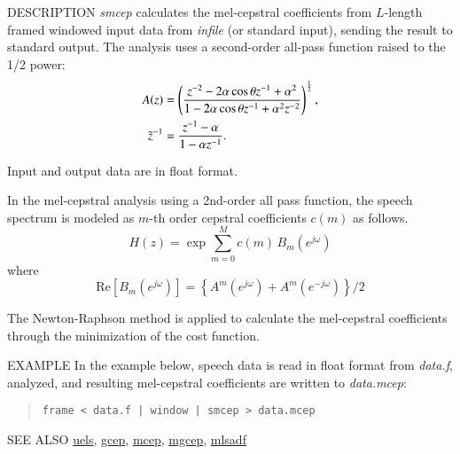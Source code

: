 \begin{qsection}{DESCRIPTION}
{\em smcep} calculates the mel-cepstral coefficients 
from $L$-length framed windowed input data 
from {\em infile} (or standard input), 
sending the result to standard output. 
The analysis uses a second-order all-pass function raised to the 1/2 power: 
\begin{align}
A(z) &=
\left(
\frac{z^{-2}-2\alpha \cos \theta z^{-1}+\alpha^2}
	{1-2\alpha \cos \theta z^{-1}+\alpha^2 z^{-2}}
\right)^{\frac{1}{2}}, \notag \\
\tilde{z}^{-1} &= \frac{z^{-1}-\alpha}{1-\alpha z^{-1}}. \notag
\end{align}

Input and output data are in float format.

In the mel-cepstral analysis using
a 2nd-order all pass function,
the speech spectrum is modeled as $m$-th order cepstral
coefficients $c(m)$ as follows.
\begin{displaymath}
H(z) = \exp \sum_{m=0}^{M} c(m)\,B_m(e^{j\omega})
\end{displaymath}
where
\begin{displaymath}
\mathrm{Re}\left[B_m(e^{j\omega})\right]
	=\left\{A^m(e^{j\omega})+A^m(e^{-j\omega})\right\}/2
\end{displaymath}
\par The Newton-Raphson method is applied to calculate
the mel-cepstral coefficients through the minimization
of the cost function.
\end{qsection}

\newpage
\begin{options}
\end{options}

\begin{qsection}{EXAMPLE}
In the example below, speech data is read in float format
from {\em data.f}, analyzed, and resulting mel-cepstral
coefficients are written to {\em data.mcep}:
\begin{quote}
 \verb!frame < data.f | window | smcep > data.mcep !
\end{quote}
\end{qsection}

\begin{qsection}{SEE ALSO}
\hyperlink{uels}{uels},
\hyperlink{gcep}{gcep},
\hyperlink{mcep}{mcep},
\hyperlink{mgcep}{mgcep},
\hyperlink{mlsadf}{mlsadf}
\end{qsection}
